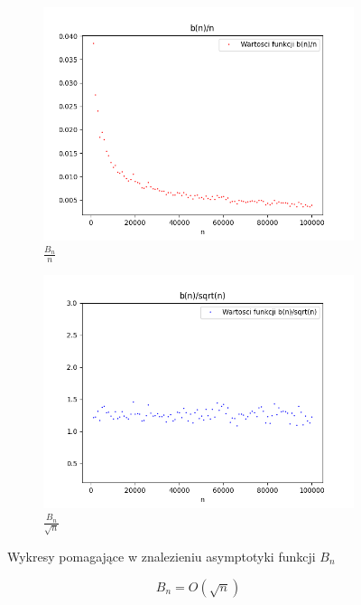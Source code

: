 \documentclass{report}
\begin{document}
    \begin{figure}[H]
        \centering
        \begin{subfigure}{.5\textwidth}
          \centering
          \includegraphics[width=1.1\linewidth]{plotbnfunc1.png}
          \caption{\( \frac{B_n}{n} \)}
          \label{fig:plotbnfunc1}
        \end{subfigure}%
        \begin{subfigure}{.5\textwidth}
          \centering
          \includegraphics[width=1.1\linewidth]{plotbnfunc2.png}
          \caption{\( \frac{B_n}{\sqrt{n}} \)}
          \label{fig:plotbnfunc2}
        \end{subfigure}
        \caption{Wykresy pomagające w znalezieniu asymptotyki funkcji \(B_n\)}
        \label{fig:bn}
    \end{figure}
\[B_n=O(\sqrt{n})\]
\end{document}
